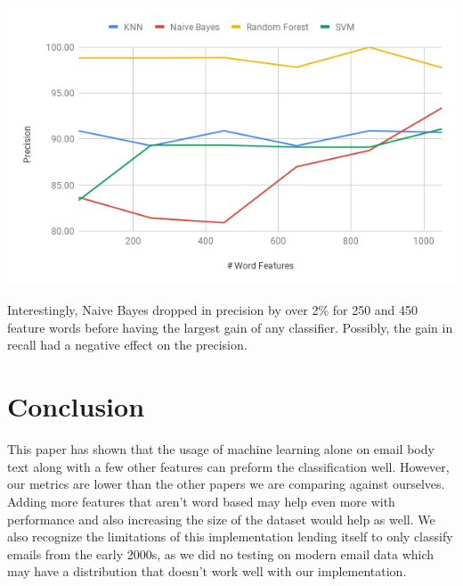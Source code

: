 \documentclass[12pt]{article}
\newenvironment{Figure}
  {\par\medskip\noindent\minipage{\linewidth}}
  {\endminipage\par\medskip}
\begin{document}
\begin{multicols}{2}
                \begin{Figure}
                    \centering
                    \includegraphics[width=\linewidth]{figures/precision_wv_effect.png}
                    \label{fig:precision_word_effect}
                \end{Figure}

                Interestingly, Naive Bayes dropped in precision by over 2\% 
                for 250 and 450 feature words before having the largest gain of any classifier. 
                Possibly, the gain in recall had a negative effect on the precision.
                
        \section{Conclusion}

            This paper has shown that the usage of machine learning alone on email body text 
            along with a few other features can preform the classification well. 
            However, our metrics are lower
            than the other papers we are comparing against ourselves. Adding more features
            that aren't word based may help even more with performance and also increasing the
            size of the dataset would help as well. We also recognize the limitations of
            this implementation lending itself to only classify emails from the early 2000s, as
            we did no testing on modern email data which may have a distribution that doesn't
            work well with our implementation.
        \nocite{*}
         
        
    \end{multicols}
\end{document}
